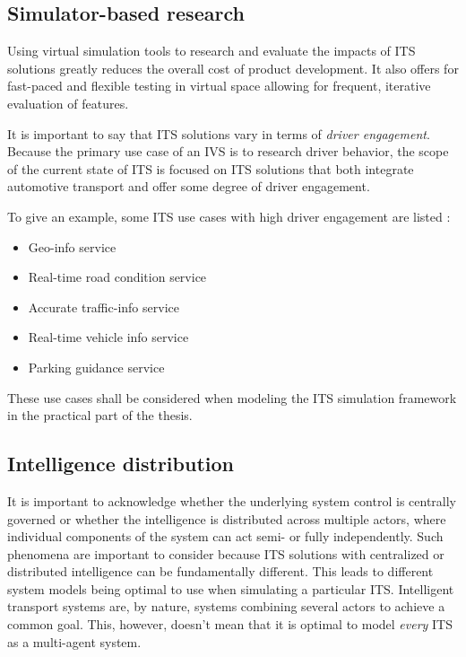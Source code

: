 \documentclass[0main.tex]{subfiles}
\begin{document}
\subsection{Simulator-based research}

Using virtual simulation tools to research and evaluate the impacts of ITS solutions 
greatly reduces the overall cost of product development. It also offers for fast-paced 
and flexible testing in virtual space allowing for frequent, iterative evaluation of features.

It is important to say that ITS solutions vary in terms of \emph{driver engagement}. Because
the primary use case of an IVS is to research driver behavior, the scope of the current state
of ITS is focused on ITS solutions that both integrate automotive transport and offer some
degree of driver engagement. 

To give an example, some ITS use cases with high driver engagement are listed \cite{Lishchenko2021}:

\begin{itemize}
    \item Geo-info service
    \item Real-time road condition service 
    \item Accurate traffic-info service 
    \item Real-time vehicle info service 
    \item Parking guidance service
\end{itemize}

These use cases shall be considered when modeling the ITS simulation framework in the practical part of the 
thesis.

\subsection{Intelligence distribution} \label{mas-compatibility}

It is important to acknowledge whether the underlying system control is centrally governed 
or whether the intelligence is distributed across multiple actors, where individual 
components of the system can act semi- or fully independently.
Such phenomena are important to consider because ITS solutions 
with centralized or distributed intelligence can be fundamentally different.
This leads to different system models being optimal to use when simulating a particular ITS. 
Intelligent transport systems are, by nature, systems combining several actors to
achieve a common goal. This, however, doesn't mean that it is optimal to model \emph{every} ITS 
as a multi-agent system. 
\end{document}
